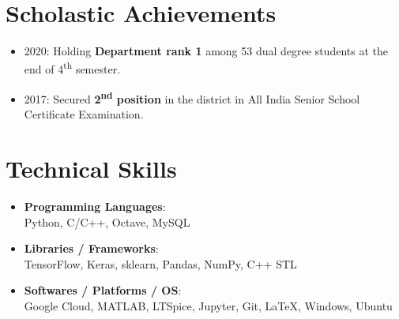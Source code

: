 \documentclass[letterpaper,11pt]{article}
\newcommand{\resumeItem}[2]{
  \item\small{
    \textbf{#1}{: #2 \vspace{-2pt}}
  }
}
\newcommand{\resumeSubItem}[2]{\resumeItem{#1}{#2}\vspace{-4pt}}
\newcommand{\resumeSubHeadingListStart}{\begin{itemize}[leftmargin=*]}
\newcommand{\resumeSubHeadingListEnd}{\end{itemize}}
\begin{document}
\section{Scholastic Achievements}
  \resumeSubHeadingListStart
      \itemsep-0.5em
      \item{2020: Holding \textbf{Department rank 1} among 53 dual degree students at the end of 4\textsuperscript{th} semester.}
      \item{2017: Secured \textbf{2\textsuperscript{nd} position} in the district in All India Senior School Certificate Examination.}
      
  \resumeSubHeadingListEnd
\section{Technical Skills}
  \resumeSubHeadingListStart
    \resumeSubItem{Programming Languages}
      {\\Python, C/C++, Octave, MySQL}
    \resumeSubItem{Libraries / Frameworks}
      {\\TensorFlow, Keras, sklearn, Pandas, NumPy, C++ STL}
    \resumeSubItem{Softwares / Platforms / OS}
      {\\Google Cloud, MATLAB, LTSpice, Jupyter, Git, \LaTeX, Windows, Ubuntu}
  \resumeSubHeadingListEnd
  
\end{document}
